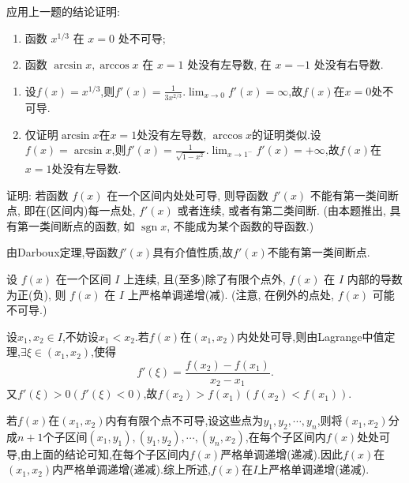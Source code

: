 \begin{exercise}[3.3.14]
    应用上一题的结论证明:
    \begin{enumerate}
        \item 函数 $x^{1/3}$ 在 $x=0$ 处不可导;
        \item 函数 $\arcsin x, \arccos x$ 在 $x=1$ 处没有左导数, 在 $x=-1$ 处没有右导数.
    \end{enumerate}
\end{exercise}

\begin{solution}
    \begin{enumerate}
        \item 设$f(x) = x^{1/3}$,则$f'(x) = \frac{1}{3x^{2/3}}$.$\lim_{x \to 0} f'(x) = \infty$,故$f(x)$在$x = 0$处不可导.
        \item 仅证明$\arcsin x$在$x = 1$处没有左导数, $\arccos x$的证明类似.设$f(x) = \arcsin x$,则$f'(x) = \frac{1}{\sqrt{1-x^2}}$.$\lim_{x \to 1^-} f'(x) = +\infty$,故$f(x)$在$x = 1$处没有左导数.
    \end{enumerate}
\end{solution}

\begin{exercise}[3.3.15]
    证明: 若函数 $f(x)$ 在一个区间内处处可导, 则导函数 $f'(x)$ 不能有第一类间断点, 即在(区间内)每一点处, $f'(x)$ 或者连续, 或者有第二类间断. (由本题推出, 具有第一类间断点的函数, 如 $\operatorname{sgn} x$, 不能成为某个函数的导函数.)
\end{exercise}

\begin{solution}
    由Darboux定理,导函数$f'(x)$具有介值性质,故$f'(x)$不能有第一类间断点.
\end{solution}

\begin{exercise}[3.3.16]
    设 $f(x)$ 在一个区间 $I$ 上连续, 且(至多)除了有限个点外, $f(x)$ 在 $I$ 内部的导数为正(负), 则 $f(x)$ 在 $I$ 上严格单调递增(减). (注意, 在例外的点处, $f(x)$ 可能不可导.)
\end{exercise}

\begin{solution}
    设$x_1,x_2 \in I$,不妨设$x_1 < x_2$.若$f(x)$在$(x_1,x_2)$内处处可导,则由Lagrange中值定理,$\exists \xi \in (x_1,x_2)$,使得
    $$
        f'(\xi) = \frac{f(x_2)-f(x_1)}{x_2-x_1}.
    $$
    又$f'(\xi) > 0 (f'(\xi) < 0)$,故$f(x_2) > f(x_1) (f(x_2) < f(x_1))$.

    若$f(x)$在$(x_1,x_2)$内有有限个点不可导,设这些点为$y_1,y_2,\cdots,y_n$,则将$(x_1,x_2)$分成$n+1$个子区间$(x_1,y_1),(y_1,y_2),\cdots,(y_n,x_2)$,在每个子区间内$f(x)$处处可导,由上面的结论可知,在每个子区间内$f(x)$严格单调递增(递减).因此$f(x)$在$(x_1,x_2)$内严格单调递增(递减).综上所述,$f(x)$在$I$上严格单调递增(递减).
\end{solution}

